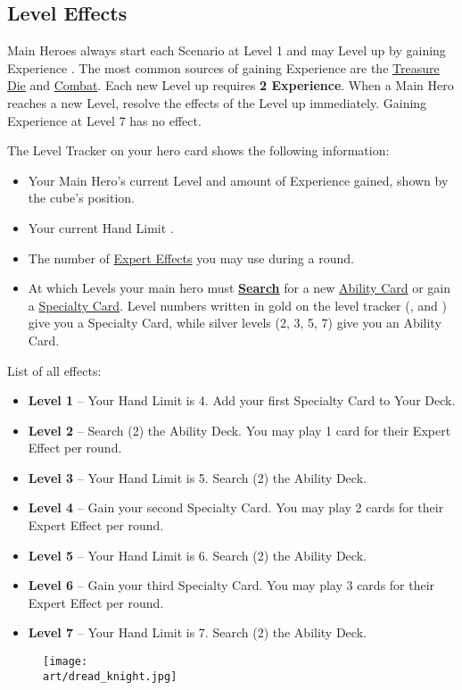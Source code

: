 \clearpage

\begin{multicols}{2}

\subsection*{\hypertarget{Level}{Level Effects}}
Main Heroes always start each Scenario at Level 1 and may Level up by gaining Experience .
The most common sources of gaining Experience are the \hyperlink{Resources}{Treasure Die} and \hyperlink{Combatexperience}{Combat}.
Each new Level up requires \textbf{2 Experience}.
When a Main Hero reaches a new Level, resolve the effects of the Level up immediately.
Gaining Experience at Level 7 has no effect.\par
The Level Tracker on your hero card shows the following information:
\begin{itemize}
\item Your Main Hero's current Level and amount of Experience gained, shown by the cube's position.
\item Your current Hand Limit .
\item The number of \hyperlink{Ability}{Expert Effects}  you may use during a round.
\item At which Levels your main hero must \hyperlink{Playerdecks}{\textbf{Search}} for a new \hyperlink{Ability}{Ability Card} or gain a \hyperlink{Specialty}{Specialty Card}.
Level numbers written in gold on the level tracker (,  and ) give you a Specialty Card, while silver levels (2, 3, 5, 7) give you an Ability Card.
\end{itemize}
List of all effects:
\begin{itemize}
\item \textbf{Level 1} – Your Hand Limit is 4.
Add your first Specialty Card to Your Deck.
\item \textbf{Level 2} – Search (2) the Ability Deck.
You may play 1 card for their Expert Effect per round.
\item \textbf{Level 3} – Your Hand Limit is 5.
Search (2) the Ability Deck.
\item \textbf{Level 4} – Gain your second Specialty Card.
You may play 2 cards for their Expert Effect per round.
\item \textbf{Level 5} – Your Hand Limit is 6.
Search (2) the Ability Deck.
\item \textbf{Level 6} – Gain your third Specialty Card.
You may play 3 cards for their Expert Effect per round.
\item \textbf{Level 7} – Your Hand Limit is 7.
Search (2) the Ability Deck.
\end{itemize}

\end{multicols}

\vspace*{\fill}

\begin{figure*}[!hb]
  \centering
  \texttt{[image: \\art/dread\_knight.jpg]}
\end{figure*}
